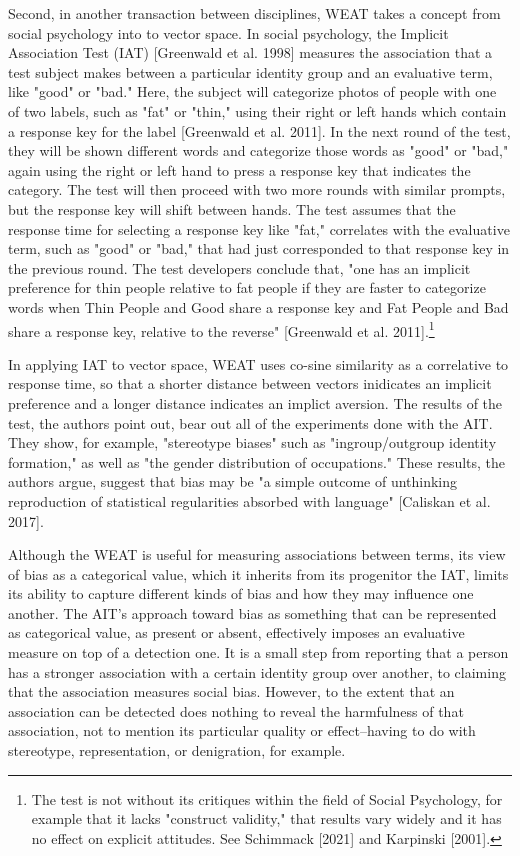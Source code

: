 \documentclass[11pt]{article}
\begin{document}
Second, in another transaction between disciplines, WEAT takes a
concept from social psychology into to vector space. In social
psychology, the Implicit Association Test (IAT) [Greenwald et al.
1998] measures the association that a test subject makes between a
particular identity group and an evaluative term, like "good" or
"bad." Here, the subject will categorize photos of people with one of
two labels, such as "fat" or "thin," using their right or left hands
which contain a response key for the label [Greenwald et al. 2011]. In
the next round of the test, they will be shown different words and
categorize those words as "good" or "bad," again using the right or
left hand to press a response key that indicates the category. The
test will then proceed with two more rounds with similar prompts, but
the response key will shift between hands. The test assumes that the
response time for selecting a response key like "fat," correlates with
the evaluative term, such as "good" or "bad," that had just
corresponded to that response key in the previous round. The test
developers conclude that, "one has an implicit preference for thin
people relative to fat people if they are faster to categorize words
when Thin People and Good share a response key and Fat People and Bad
share a response key, relative to the reverse" [Greenwald et al.
2011].\footnote{The test is not without its critiques within the field of Social
Psychology, for example that it lacks "construct validity," that
results vary widely and it has no effect on explicit attitudes. See
Schimmack [2021] and Karpinski [2001].}

In applying IAT to vector space, WEAT uses co-sine similarity as a
correlative to response time, so that a shorter distance between
vectors inidicates an implicit preference and a longer distance
indicates an implict aversion. The results of the test, the authors
point out, bear out all of the experiments done with the AIT. They
show, for example, "stereotype biases" such as "ingroup/outgroup
identity formation," as well as "the gender distribution of
occupations." These results, the authors argue, suggest that bias may
be "a simple outcome of unthinking reproduction of statistical
regularities absorbed with language" [Caliskan et al. 2017].

Although the WEAT is useful for measuring associations between terms,
its view of bias as a categorical value, which it inherits from its
progenitor the IAT, limits its ability to capture different kinds of
bias and how they may influence one another. The AIT's approach toward
bias as something that can be represented as categorical value, as
present or absent, effectively imposes an evaluative measure on top of
a detection one. It is a small step from reporting that a person has a
stronger association with a certain identity group over another, to
claiming that the association measures social bias. However, to the
extent that an association can be detected does nothing to reveal the
harmfulness of that association, not to mention its particular quality
or effect--having to do with stereotype, representation, or
denigration, for example. 
\end{document}
